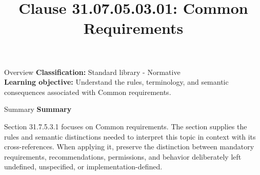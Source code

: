 \documentclass[10pt,letterpaper]{article}
\title{Clause 31.07.05.03.01: Common Requirements}
\author{}
\date{}
\begin{document}
\maketitle
\begin{CornellOverviewBox}{Overview}
\textbf{Classification:} Standard library - Normative\\[2pt]
\textbf{Learning objective:} Understand the rules, terminology, and semantic consequences associated with Common requirements.
\end{CornellOverviewBox}\begin{CornellSummaryBox}{Summary}
{\sffamily\bfseries\color{Accent} Summary}\par\vspace{3pt}Section 31.7.5.3.1 focuses on Common requirements. The section supplies the rules and semantic distinctions needed to interpret this topic in context with its cross-references. When applying it, preserve the distinction between mandatory requirements, recommendations, permissions, and behavior deliberately left undefined, unspecified, or implementation-defined.
\end{CornellSummaryBox}
\end{document}

